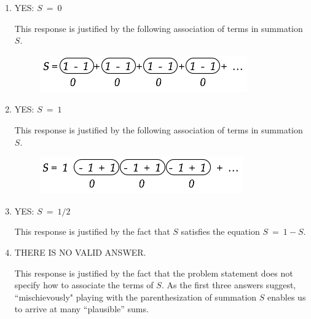 \begin{enumerate}
\item
YES: $S \ = \ 0$

\smallskip

This response is justified by the following association of terms in summation $S$.
\vspace{-0.2cm}

\begin{figure}[h]
\begin{center}
        \includegraphics[scale=0.45]{FiguresArithmetic/InfiniteParadox1}
\end{center}
\end{figure}
\vspace{-0.6cm}

\item
YES: $S \ = \ 1$

\smallskip

This response is justified by the following association of terms in summation $S$.
\vspace{-0.2cm}

\begin{figure}[h]
\begin{center}
        \includegraphics[scale=0.45]{FiguresArithmetic/InfiniteParadox2}
\end{center}
\end{figure}
\vspace{-0.6cm}

\item
YES: $S \ = \ 1/2$
\smallskip

This response is justified by the fact that $S$ satisfies the equation $S \ = \ 1-S$.

\medskip\item
THERE IS NO VALID ANSWER.

\smallskip

This response is justified by the fact that the problem statement does not specify how to associate the terms of $S$.  As the first three answers suggest, ``mischievously" playing with the parenthesization of summation $S$ enables us to arrive at many ``plausible'' sums.
\end{enumerate}

